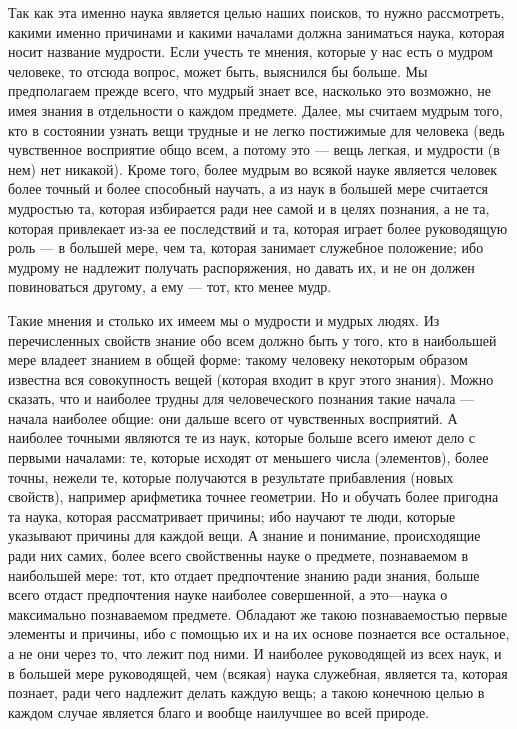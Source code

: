 \documentclass{article}
\begin{document}
Так как эта именно наука является целью наших поисков, то нужно рассмотреть, какими именно причинами и какими началами должна заниматься наука, которая носит название
\footnotemark[1]
мудрости. Если учесть те мнения, которые у нас есть о мудром человеке, то отсюда вопрос, может быть, выяснился бы больше. Мы предполагаем прежде всего, что мудрый знает все, насколько это возможно, не имея знания в отдельности о каждом предмете. Далее, мы считаем мудрым того, кто в состоянии узнать вещи трудные и не легко постижимые для человека (ведь чувственное восприятие общо всем, а потому это — вещь легкая, и мудрости (в нем) нет никакой). Кроме того, более мудрым во всякой науке является человек более точный и более способный научать, а из наук в большей мере считается мудростью та, которая избирается ради нее самой и в целях познания, а не та, которая привлекает из-за ее последствий и та, которая играет более руководящую роль — в большей мере, чем та, которая занимает служебное положение; ибо мудрому не надлежит получать распоряжения, но давать их, и не он должен повиноваться другому, а ему — тот, кто менее мудр.

Такие мнения и столько их имеем мы о мудрости и мудрых людях. Из перечисленных свойств знание обо всем должно быть у того, кто в наибольшей мере владеет знанием в общей форме: такому человеку некоторым образом
\footnotemark[2]
известна вся совокупность вещей (которая входит в круг этого знания).
\footnotemark[3]
Можно сказать, что и наиболее трудны для человеческого познания такие начала — начала наиболее общие: они дальше всего от чувственных восприятий. А наиболее точными являются те из наук, которые больше всего имеют дело с первыми началами: те, которые исходят от меньшего числа (элементов), более точны, нежели те, которые получаются в результате прибавления (новых свойств), например арифметика точнее геометрии. Но и обучать более пригодна та наука, которая рассматривает причины; ибо научают те люди, которые указывают причины для каждой вещи. А знание и понимание, происходящие ради них самих, более всего свойственны науке о предмете, познаваемом в наибольшей мере:
\footnotemark[4]
тот, кто отдает предпочтение знанию ради знания, больше всего отдаст предпочтения науке наиболее совершенной,
\footnotemark[5]
а это—наука о максимально познаваемом предмете. Обладают же такою познаваемостью первые элементы и причины, ибо с помощью их и на их основе познается все остальное, а не они через то, что лежит под ними.
\footnotemark[6]
И наиболее руководящей из всех наук, и в большей мере руководящей, чем (всякая) наука служебная, является та, которая познает, ради чего надлежит делать каждую вещь; а такою конечною целью в каждом случае является благо и вообще наилучшее во всей природе.
\end{document}
